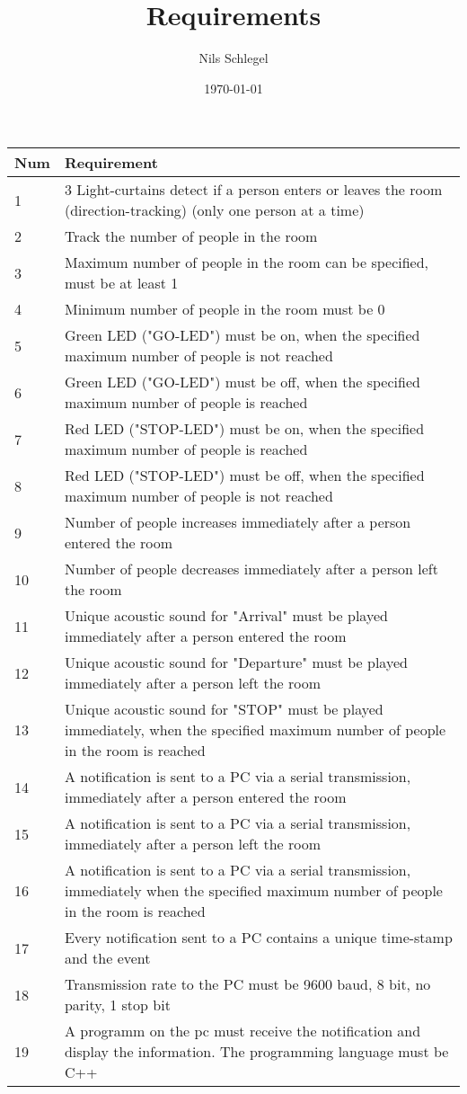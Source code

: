 \documentclass[a4paper,12pt]{book}
\begin{document}
\title{Requirements}
\author{Nils Schlegel}
\date{\today}
\maketitle %

\setcounter{chapter}{0}


\begin{center}
\begin{tabular}[h]{l p{\columnwidth}}
    Num & Requirement \\ \hline
    1 & 3 Light-curtains detect if a person enters or leaves the room (direction-tracking) (only one person at a time) \\
    2 & Track the number of people in the room \\
    3 & Maximum number of people in the room can be specified, must be at least 1 \\
    4 & Minimum number of people in the room must be 0 \\
    5 & Green LED ("GO-LED") must be on, when the specified maximum number of people is not reached \\
    6 & Green LED ("GO-LED") must be off, when the specified maximum number of people is reached \\
    7 & Red LED ("STOP-LED") must be on, when the specified maximum number of people is reached \\
    8 & Red LED ("STOP-LED") must be off, when the specified maximum number of people is not reached \\
    9 & Number of people increases immediately after a person entered the room \\
    10 & Number of people decreases immediately after a person left the room \\
    11 & Unique acoustic sound for "Arrival" must be played immediately after a person entered the room \\
    12 & Unique acoustic sound for "Departure" must be played immediately after a person left the room \\
    13 & Unique acoustic sound for "STOP" must be played immediately, when the specified maximum number of people in the room is reached \\
    14 & A notification is sent to a PC via a serial transmission,  immediately after a person entered the room \\
    15 & A notification is sent to a PC via a serial transmission,  immediately after a person left the room \\
    16 & A notification is sent to a PC via a serial transmission,  immediately when the specified maximum number of people in the room is reached \\
    17 & Every notification sent to a PC contains a unique time-stamp and the event \\
    18 & Transmission rate to the PC must be 9600 baud, 8 bit, no parity, 1 stop bit \\
    19 & A programm on the pc must receive the notification and display the information. The programming language must be C++ \\
\end{tabular}
\end{center}
\end{document}
